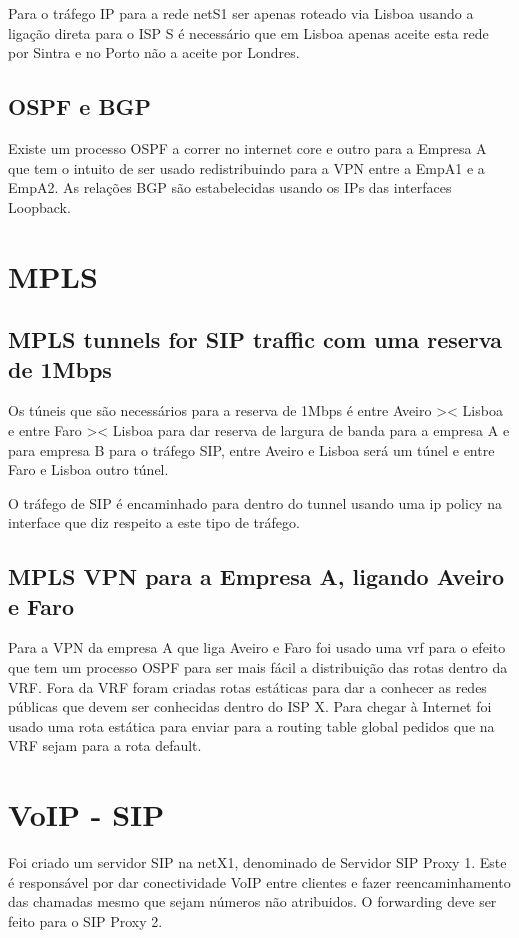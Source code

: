 \documentclass[pdftex,12pt,a4paper]{report}
\begin{document}
Para o tráfego IP para a rede netS1 ser apenas roteado via Lisboa usando a ligação direta para o ISP S é necessário que em Lisboa apenas aceite esta rede por Sintra e no Porto não a aceite por Londres.

\subsection{OSPF e BGP}

Existe um processo OSPF a correr no internet core e outro para a Empresa A que tem o intuito de ser usado redistribuindo para a VPN entre a EmpA1 e a EmpA2. As relações BGP são estabelecidas usando os IPs das interfaces Loopback.

\section{MPLS}

\subsection{MPLS tunnels for SIP traffic com uma reserva de 1Mbps}
Os túneis que são necessários para a reserva de 1Mbps é entre Aveiro >< Lisboa e entre Faro >< Lisboa para dar reserva de largura de banda para a empresa A e para empresa B para o tráfego SIP, entre Aveiro e Lisboa será um túnel e entre Faro e Lisboa outro túnel.

O tráfego de SIP é encaminhado para dentro do tunnel usando uma ip policy na interface que diz respeito a este tipo de tráfego.

\subsection{MPLS VPN para a Empresa A, ligando Aveiro e Faro}
Para a VPN da empresa A que liga Aveiro e Faro foi usado uma vrf para o efeito que tem um processo OSPF para ser mais fácil a distribuição das rotas dentro da VRF. Fora da VRF foram criadas rotas estáticas para dar a conhecer as redes públicas que devem ser conhecidas dentro do ISP X. Para chegar à Internet foi usado uma rota estática para enviar para a routing table global pedidos que na VRF sejam para a rota default.

\section{VoIP - SIP}

Foi criado um servidor SIP na netX1, denominado de Servidor SIP Proxy 1. Este é responsável por dar conectividade VoIP entre clientes e fazer reencaminhamento das chamadas mesmo que sejam números não atribuidos. O forwarding deve ser feito para o SIP Proxy 2.
\end{document}
